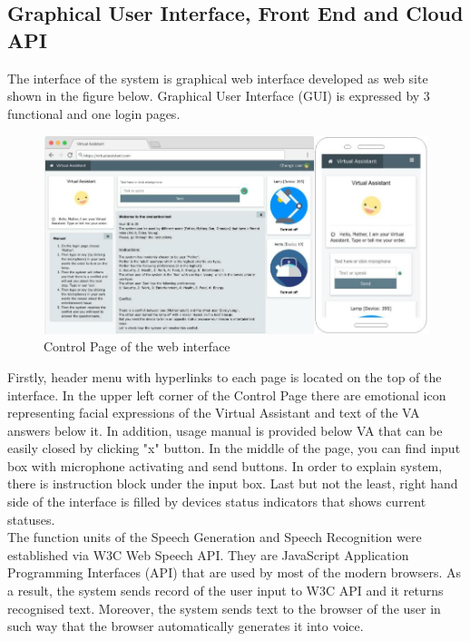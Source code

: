 \documentclass{llncs}
\begin{document}
    \subsection{Graphical User Interface, Front End and Cloud API}
    The interface of the system is graphical web interface developed as web site shown in the figure below.
    Graphical User Interface (GUI) is expressed by 3 functional and one login pages.\\
    \begin{figure}
        \includegraphics[width=\textwidth]{mockup.png}
        \caption[]{Control Page of the web interface}
    \end{figure}
    Firstly, header menu with hyperlinks to each page is located on the top of the interface.
    In the upper left corner of the Control Page there are emotional icon representing facial expressions of the Virtual Assistant
    and text of the VA answers below it.
    In addition, usage manual is provided below VA that can be easily closed by clicking "x" button.
    In the middle of the page, you can find input box with microphone activating and send buttons.
    In order to explain system, there is instruction block under the input box.
    Last but not the least, right hand side of the interface is filled by devices status indicators that shows current statuses.\\
    The function units of the Speech Generation and Speech Recognition were established via W3C Web Speech API.
    They are JavaScript Application Programming Interfaces (API) that are used by most of the modern browsers.
    As a result, the system sends record of the user input to W3C API and it returns recognised text.
    Moreover, the system sends text to the browser of the user in such way that the browser automatically generates it into voice.
\end{document}
